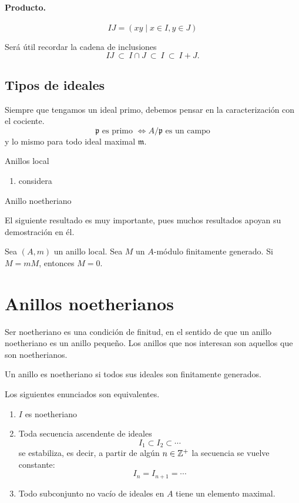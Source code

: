 \documentclass[b5paper,10pt]{book}
\begin{document}
\paragraph{Producto.}%
\[
IJ = \left(xy\mid x\in I, y\in J\right)
\]


Será útil recordar la cadena de inclusiones
\[
IJ\ \subset\ I\cap J\ \subset\ I\ \subset\ I+J.
\]

\subsection{Tipos de ideales}

Siempre que tengamos un ideal primo,
debemos pensar en la caracterización con el cociente.
\[
	\mathfrak{p}\text{ es primo } \iff A/\mathfrak{p} \text{ es un campo}
\]
y lo mismo para todo ideal maximal \(\mathfrak{m}\).


Anillos local


\begin{ej}
\begin{enumerate}[label=(i)]
	\item considera
\end{enumerate}
\end{ej}
Anillo noetheriano

El siguiente resultado es muy importante,
pues muchos resultados apoyan su demostración en él.

\begin{thm}
Sea \((A,m)\) un anillo local.
Sea \(M\) un \(A\)-módulo finitamente generado.
Si \(M=mM\), entonces \(M=0\).
\end{thm}

\section{Anillos noetherianos}

Ser noetheriano es una condición de finitud,
en el sentido de que un anillo noetheriano
es un anillo pequeño.
Los anillos que nos interesan son aquellos 
que son noetherianos.

\begin{defi}
Un anillo es noetheriano si todos sus ideales
son finitamente generados.
\end{defi}

\begin{thm}
Los siguientes enunciados son equivalentes.
\begin{enumerate}[label=(\roman*)]
\item \(I\) es noetheriano
\item Toda secuencia ascendente de ideales 
	\[
	I_1\subset I_2\subset \cdots
	\]
	se estabiliza, es decir, a partir de algún 
	\(n\in \mathbb{Z}^+\) la secuencia se vuelve constante:
	\[
	I_n = I_{n+1} = \cdots
	\]
\item Todo subconjunto no vacío de ideales en \(A\) tiene un elemento maximal.
\end{enumerate}
\end{thm}
\end{document}
